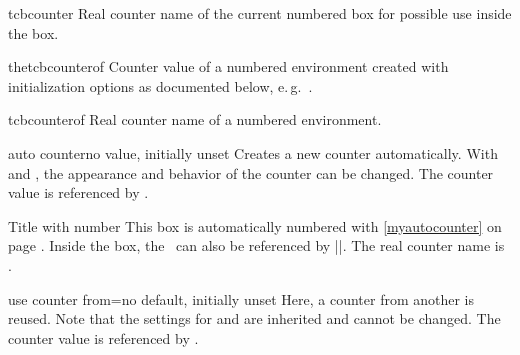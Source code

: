 \begin{docCommand}{tcbcounter}{}
Real counter name of the current numbered box for possible use inside the box.
\end{docCommand}

\begin{docCommand}[doc new=2025-07-21]{thetcbcounterof}{}
Counter value of a numbered  environment created with
initialization options as documented below, e.\,g.\ .
\end{docCommand}

\begin{docCommand}[doc new=2025-07-21]{tcbcounterof}{}
Real counter name of a numbered  environment.
\end{docCommand}


\clearpage
\begin{newTcbKey}{auto counter}{}{no value, initially unset}
Creates a new counter automatically.
With  and
, the appearance and behavior of the counter
can be changed. The counter value is referenced by .


\begin{dispExample}
\begin{pabox}[label={myautocounter}]{Title with number}
This box is automatically numbered with \ref{myautocounter} on page
\pageref{myautocounter}. Inside the box, the \thetcbcounter\ can
also be referenced by |\thetcbcounter|.
The real counter name is \texttt{\tcbcounter}.
\end{pabox}
\end{dispExample}
\end{newTcbKey}


\begin{newTcbKey}{use counter from}{=}{no default, initially unset}
Here, a counter from another  is reused.
Note that the settings for  and
 are inherited and cannot be changed.
The counter value is referenced by .

\end{newTcbKey}



